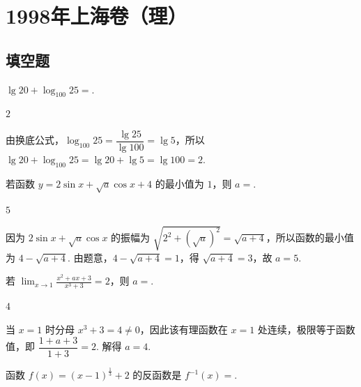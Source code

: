 \chapter{1998年上海卷（理）}
\section{填空题}

\begin{problem}
\(\lg20 + \log_{100}25 = \)\fillinblank{}.
\end{problem}

\begin{answer}
\(2\)
\end{answer}

\begin{solution}
由换底公式，\(\log_{100}25=\dfrac{\lg25}{\lg100}=\lg5\)，所以 \(\lg20+\log_{100}25=\lg20+\lg5=\lg100=2\).
\end{solution}

\begin{problem}
若函数 \(y = 2\sin x + \sqrt{a} \cos x + 4 \) 的最小值为 \(1\)，则 \(a=\)\fillinblank{}.
\end{problem}

\begin{answer}
\(5\)
\end{answer}

\begin{solution}
因为 \(2\sin x+\sqrt{a}\cos x\) 的振幅为 \(\sqrt{2^2+(\sqrt{a})^2}=\sqrt{a+4}\)，所以函数的最小值为 \(4-\sqrt{a+4}\). 由题意，\(4-\sqrt{a+4}=1\)，得 \(\sqrt{a+4}=3\)，故 \(a=5\).
\end{solution}

\begin{problem}
若 \(\displaystyle\lim_{x\to 1}\frac{x^{2}+ax+3}{x^{3}+3}=2\)，则 \(a=\)\fillinblank{}.
\end{problem}

\begin{answer}
\(4\)
\end{answer}

\begin{solution}
当 \(x=1\) 时分母 \(x^3+3=4\ne0\)，因此该有理函数在 \(x=1\) 处连续，极限等于函数值，即 \(\dfrac{1+a+3}{1+3}=2\). 解得 \(a=4\).
\end{solution}

\begin{problem}
函数 \(f(x)=(x-1)^{\frac{1}{3}}+2 \) 的反函数是 \(f^{-1}(x)= \)\fillinblank{}.
\end{problem}


